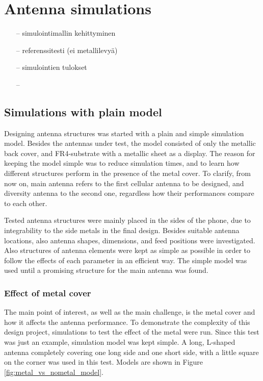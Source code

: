 \section{Antenna simulations}
\label{sec:simulations}

\begin{itemize}
\item[--]simulointimallin kehittyminen
\item[--]referenssitesti (ei metallilevyä)
\item[--]simulointien tulokset
\item[--]
\end{itemize}






\subsection{Simulations with plain model}
\label{sec:sim_plain}
Designing antenna structures was started with a plain and simple simulation model. Besides the antennas under test, the model consisted of only the metallic back cover, and FR4-substrate with a metallic sheet as a display. The reason for keeping the model simple was to reduce simulation times, and to learn how different structures perform in the presence of the metal cover. To clarify, from now on, main antenna refers to the first cellular antenna to be designed, and diversity antenna to the second one, regardless how their performances compare to each other. 

Tested antenna structures were mainly placed in the sides of the phone, due to integrability to the side metals in the final design. Besides suitable antenna locations, also antenna shapes, dimensions, and feed positions were investigated. Also structures of antenna elements were kept as simple as possible in order to follow the effects of each parameter in an efficient way. The simple model was used until a promising structure for the main antenna was found. 

\subsubsection{Effect of metal cover}
\label{sec:metal_effect}
The main point of interest, as well as the main challenge, is the metal cover and how it affects the antenna performance. To demonstrate the complexity of this design project, simulations to test the effect of the metal were run. Since this test was just an example, simulation model was kept simple. A long, L-shaped antenna completely covering one long side and one short side, with a little square on the corner was used in this test. Models are shown in Figure \ref{fig:metal_vs_nometal_model}.

